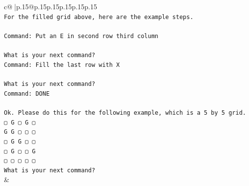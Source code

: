 \documentclass{article}
\begin{document}
{\begin{supertabular}{c@{$\;$}|p{.15\linewidth}@{}p{.15\linewidth}p{.15\linewidth}p{.15\linewidth}p{.15\linewidth}p{.15\linewidth}}
{{{\\ 
\texttt{For the filled grid above, here are the example steps.} \\
\\ 
\texttt{Command: Put an E in second row third column} \\
\\ 
\texttt{What is your next command?} \\
\texttt{Command: Fill the last row with X} \\
\\ 
\texttt{What is your next command?} \\
\texttt{Command: DONE} \\
\\ 
\texttt{Ok. Please do this for the following example, which is a 5 by 5 grid.} \\
\texttt{▢ G ▢ G ▢} \\
\texttt{G G ▢ ▢ ▢} \\
\texttt{▢ G G ▢ ▢} \\
\texttt{▢ G ▢ ▢ G} \\
\texttt{▢ ▢ ▢ ▢ ▢} \\
\texttt{What is your next command?} \\
            }
        }
    }
    & \\ \\


\end{supertabular}}
\end{document}
